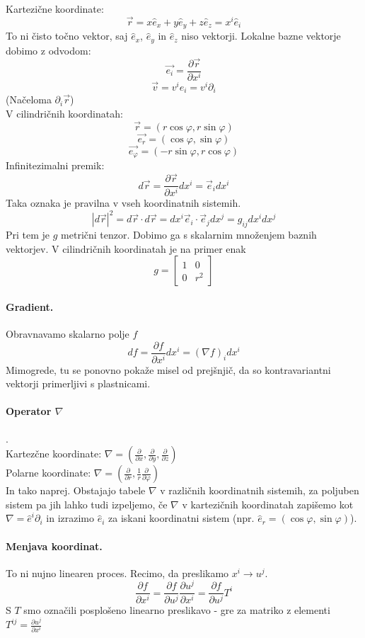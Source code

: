 \documentclass[a4paper]{article}
\newcommand{\vct}[1]{\overrightarrow{#1}}
\newcommand{\pd}[2]{\frac{\partial {#1}}{\partial {#2}}}
\begin{document}
Kartezične koordinate:
$$\vct{r} = x\hat{e}_x + y\hat{e}_y + z\hat{e}_z = x^{i}\hat{e}_i$$
To ni čisto točno vektor, saj $\hat{e}_x$, $\hat{e}_y$ in $\hat{e}_z$ niso vektorji. Lokalne bazne vektorje dobimo z odvodom:
$$\vct{e_i} = \pd{\vct{r}}{x^i}$$
$$\vct{v} = v^i\hat{e}_i = v^i\partial_i$$
(Načeloma $\partial_i \vct{r}$) \\[4mm]
V cilindričnih koordinatah: $$\vct{r} = (r\cos\varphi, r\sin\varphi)$$
$$\vct{e_r} = (\cos\varphi, \sin\varphi)$$
$$\vct{e_\varphi} = (-r\sin\varphi, r\cos\varphi)$$
Infinitezimalni premik:
$$d\vct{r} = \pd{\vct{r}}{x^i}dx^i = \vct{e}_idx^i$$
Taka oznaka je pravilna v vseh koordinatnih sistemih.
$$|d\vct{r}|^2 = d\vct{r} \cdot d\vct{r} = dx^i\vct{e}_i\cdot\vct{e}_jdx^j = g_{ij}dx^idx^j$$
Pri tem je $g$ metrični tenzor. Dobimo ga s skalarnim množenjem baznih vektorjev. V cilindričnih koordinatah je na primer enak
$$g = \begin{bmatrix}
    1 & 0 \\ 0 & r^2
\end{bmatrix}$$
\paragraph{Gradient.} Obravnavamo skalarno polje $f$
$$df = \pd{f}{x^i}dx^i = (\nabla f)_idx^i$$
Mimogrede, tu se ponovno pokaže misel od prejšnjič, da so kontravariantni vektorji primerljivi s plastnicami.
\paragraph{Operator $\nabla$}. \\
Kartezčne koordinate: $\displaystyle{\nabla = \left(\pd{}{x}, \pd{}{y}, \pd{}{z}\right)}$ \\
Polarne koordinate: $\displaystyle{\nabla = \left(\pd{}{r}, \frac{1}{r}\pd{}{\varphi}\right)}$ \\
In tako naprej. Obstajajo tabele $\nabla$ v različnih koordinatnih sistemih, za poljuben sistem pa jih lahko tudi izpeljemo, če $\nabla$ v kartezičnih koordinatah zapišemo kot $\nabla = \hat{e}^i\partial_i$
in izrazimo $\hat{e}_i$ za iskani koordinatni sistem (npr. $\hat{e}_r = (\cos\varphi, \sin\varphi)$).
\paragraph{Menjava koordinat.} To ni nujno linearen proces. Recimo, da preslikamo $x^i \to u^j$.
$$\pd{f}{x^i} = \pd{f}{u^j}\pd{u^j}{x^i} = \pd{f}{u^j}T^i$$
S $T$ smo označili posplošeno linearno preslikavo - gre za matriko z elementi $T^{ij} = \pd{u^j}{x^i}$
\end{document}
